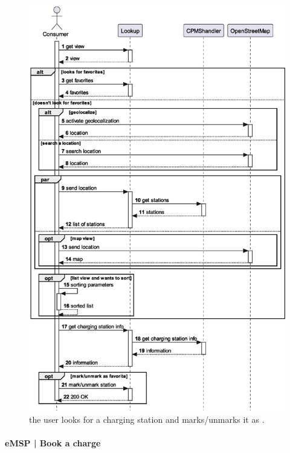 \begin{figure}[h!]
    \centering
    \includegraphics[width=0.67\columnwidth]{./images/diagrams/sequences/emsp/lookup}
    \caption{the user looks for a charging station and marks/unmarks it as .}
\end{figure}

\pagebreak

\paragraph{eMSP | Book a charge}

